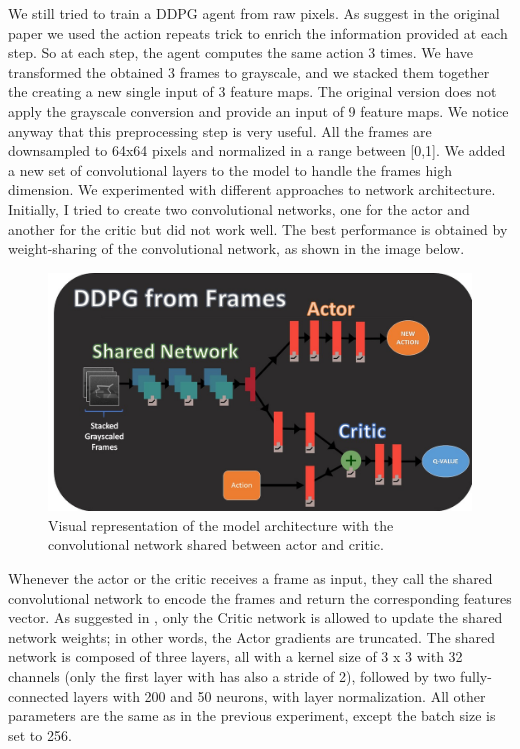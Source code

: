 We still tried to train a DDPG agent from raw pixels. 
As suggest in the original paper \cite{lillicrap2015continuous} we used the action repeats trick to enrich the information provided at each step. So at each step, the agent computes the same action 3 times. We have transformed the obtained 3 frames to grayscale, and we stacked them together the creating a new single input of 3 feature maps. The original version does not apply the grayscale conversion and provide an input of 9 feature maps. We notice anyway that this preprocessing step is very useful.
All the frames are downsampled to 64x64 pixels and normalized in a range between [0,1]. 
We added a new set of convolutional layers to the model to handle the frames high dimension.
We experimented with different approaches to network architecture.
Initially, I tried to create two convolutional networks, one for the actor and another for the critic but did not work well.
The best performance is obtained by weight-sharing of the convolutional network, as shown in the image below.

\begin{figure}[H]
\centering
\includegraphics[width=1.\textwidth, height=.35\textheight]{pictures/ddpg_shared_net}
\caption{ Visual representation of the model architecture with the convolutional network shared between actor and critic.}
\end{figure}

Whenever the actor or the critic receives a frame as input, they call the shared convolutional network to encode the frames and return the corresponding features vector.
As suggested in \cite{tassa2018deepmind}, only the Critic network is allowed to update the shared network weights; in other words, the Actor gradients are truncated.
The shared network is composed of three layers, all with a kernel size of 3 x 3 with 32 channels (only the first layer with has also a stride of 2),  followed by two fully-connected layers with 200 and 50 neurons, with layer normalization.
All other parameters are the same as in the previous experiment, except the batch size is set to 256.

